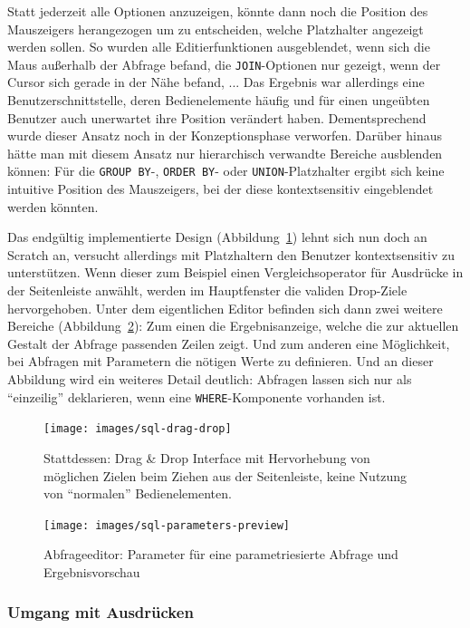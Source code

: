 Statt jederzeit alle Optionen anzuzeigen, könnte dann noch die Position des Mauszeigers herangezogen um zu entscheiden, welche Platzhalter angezeigt werden sollen. So wurden alle Editierfunktionen ausgeblendet, wenn sich die Maus außerhalb der Abfrage befand, die \texttt{JOIN}-Optionen nur gezeigt, wenn der Cursor sich gerade in der Nähe befand, ... Das Ergebnis war allerdings eine Benutzerschnittstelle, deren Bedienelemente häufig und für einen ungeübten Benutzer auch unerwartet ihre Position verändert haben. Dementsprechend wurde dieser Ansatz noch in der Konzeptionsphase verworfen. Darüber hinaus hätte man mit diesem Ansatz nur hierarchisch verwandte Bereiche ausblenden können: Für die \texttt{GROUP BY}-, \texttt{ORDER BY}- oder \texttt{UNION}-Platzhalter ergibt sich keine intuitive Position des Mauszeigers, bei der diese kontextsensitiv eingeblendet werden könnten.

Das endgültig implementierte Design (Abbildung~\ref{fig:screen-sql-editor-drag-drop}) lehnt sich nun doch an Scratch an, versucht allerdings mit Platzhaltern den Benutzer kontextsensitiv zu unterstützen. Wenn dieser zum Beispiel einen Vergleichsoperator für Ausdrücke in der Seitenleiste anwählt, werden im Hauptfenster die validen Drop-Ziele hervorgehoben. Unter dem eigentlichen Editor befinden sich dann zwei weitere Bereiche (Abbildung~\ref{fig:screen-sql-editor-parameters-preview}): Zum einen die Ergebnisanzeige, welche die zur aktuellen Gestalt der Abfrage passenden Zeilen zeigt. Und zum anderen eine Möglichkeit, bei Abfragen mit Parametern die nötigen Werte zu definieren. Und an dieser Abbildung wird ein weiteres Detail deutlich: Abfragen lassen sich nur als "`einzeilig"' deklarieren, wenn eine \texttt{WHERE}-Komponente vorhanden ist.

\begin{figure}[h]
  \texttt{[image: images/sql-drag-drop]}
  \caption{Stattdessen: Drag \& Drop Interface mit Hervorhebung von möglichen Zielen beim Ziehen aus der Seitenleiste, keine Nutzung von "`normalen"' Bedienelementen.}
  \label{fig:screen-sql-editor-drag-drop}
\end{figure}

\begin{figure}[p]
  \texttt{[image: images/sql-parameters-preview]}
  \caption{Abfrageeditor: Parameter für eine parametriesierte Abfrage und Ergebnisvorschau}
  \label{fig:screen-sql-editor-parameters-preview}
\end{figure}

\subsubsection{Umgang mit Ausdrücken}

